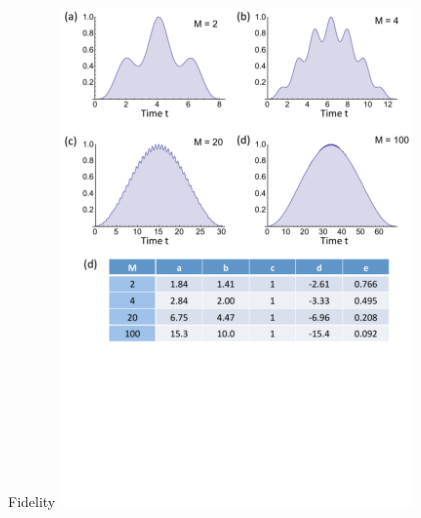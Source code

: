 \documentclass{beamer}
\begin{document}
\begin{frame}[t]{Fidelity}
	\centering
	\includegraphics[trim=-20mm 0mm 30mm 0mm, width=0.7\textwidth]{Images/switch_fidelities}
\end{frame}
\end{document}
